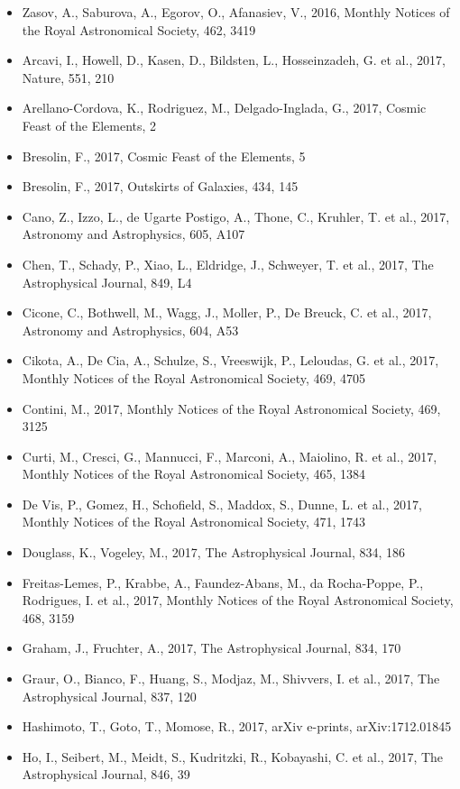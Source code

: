 \documentclass{letter}
\begin{document}
\begin{enumerate}
\begin{itemize}
\item Zasov, A., Saburova, A., Egorov, O., Afanasiev, V., 2016, Monthly Notices of the Royal Astronomical Society, 462, 3419
\item Arcavi, I., Howell, D., Kasen, D., Bildsten, L., Hosseinzadeh, G. et al., 2017, Nature, 551, 210
\item Arellano-Cordova, K., Rodriguez, M., Delgado-Inglada, G., 2017, Cosmic Feast of the Elements, 2
\item Bresolin, F., 2017, Cosmic Feast of the Elements, 5
\item Bresolin, F., 2017, Outskirts of Galaxies, 434, 145
\item Cano, Z., Izzo, L., de Ugarte Postigo, A., Thone, C., Kruhler, T. et al., 2017, Astronomy and Astrophysics, 605, A107
\item Chen, T., Schady, P., Xiao, L., Eldridge, J., Schweyer, T. et al., 2017, The Astrophysical Journal, 849, L4
\item Cicone, C., Bothwell, M., Wagg, J., Moller, P., De Breuck, C. et al., 2017, Astronomy and Astrophysics, 604, A53
\item Cikota, A., De Cia, A., Schulze, S., Vreeswijk, P., Leloudas, G. et al., 2017, Monthly Notices of the Royal Astronomical Society, 469, 4705
\item Contini, M., 2017, Monthly Notices of the Royal Astronomical Society, 469, 3125
\item Curti, M., Cresci, G., Mannucci, F., Marconi, A., Maiolino, R. et al., 2017, Monthly Notices of the Royal Astronomical Society, 465, 1384
\item De Vis, P., Gomez, H., Schofield, S., Maddox, S., Dunne, L. et al., 2017, Monthly Notices of the Royal Astronomical Society, 471, 1743
\item Douglass, K., Vogeley, M., 2017, The Astrophysical Journal, 834, 186
\item Freitas-Lemes, P., Krabbe, A., Faundez-Abans, M., da Rocha-Poppe, P., Rodrigues, I. et al., 2017, Monthly Notices of the Royal Astronomical Society, 468, 3159
\item Graham, J., Fruchter, A., 2017, The Astrophysical Journal, 834, 170
\item Graur, O., Bianco, F., Huang, S., Modjaz, M., Shivvers, I. et al., 2017, The Astrophysical Journal, 837, 120
\item Hashimoto, T., Goto, T., Momose, R., 2017, arXiv e-prints, arXiv:1712.01845
\item Ho, I., Seibert, M., Meidt, S., Kudritzki, R., Kobayashi, C. et al., 2017, The Astrophysical Journal, 846, 39

\end{itemize}
\end{enumerate}
\end{document}
